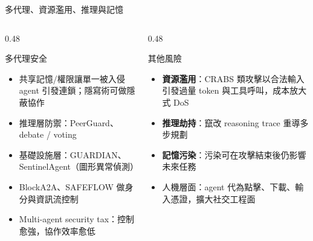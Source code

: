 \documentclass[aspectratio=169]{beamer}
\begin{document}
\begin{frame}{多代理、資源濫用、推理與記憶}
    \footnotesize
    \begin{columns}[T]
        \begin{column}{0.48\textwidth}
            \begin{block}{多代理安全}
                \begin{itemize}
                    \item 共享記憶/權限讓單一被入侵 agent 引發連鎖；隱寫術可做隱蔽協作
                    \item 推理層防禦：PeerGuard、debate / voting
                    \item 基礎設施層：GUARDIAN、SentinelAgent（圖形異常偵測）
                    \item BlockA2A、SAFEFLOW 做身分與資訊流控制
                    \item \alert{Multi-agent security tax}：控制愈強，協作效率愈低
                \end{itemize}
            \end{block}
        \end{column}
        \begin{column}{0.48\textwidth}
            \begin{block}{其他風險}
                \begin{itemize}
                    \item \textbf{資源濫用}：CRABS 類攻擊以合法輸入引發過量 token 與工具呼叫，成本放大式 DoS
                    \item \textbf{推理劫持}：竄改 reasoning trace 重導多步規劃
                    \item \textbf{記憶污染}：污染可在攻擊結束後仍影響未來任務
                    \item 人機層面：agent 代為點擊、下載、輸入憑證，擴大社交工程面
                \end{itemize}
            \end{block}
        \end{column}
    \end{columns}
\end{frame}
\end{document}
